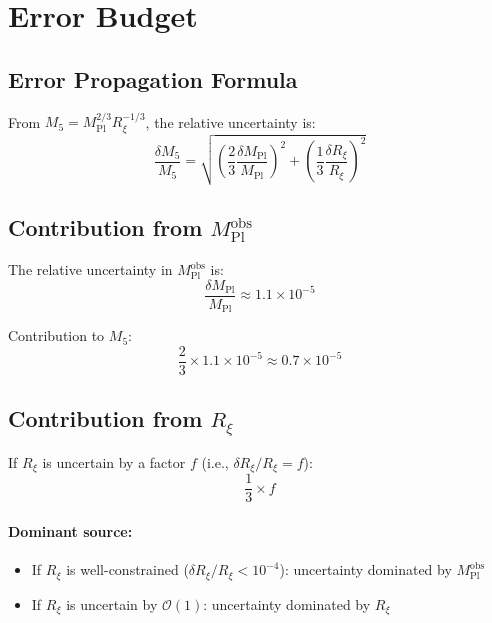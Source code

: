 \documentclass[11pt,a4paper]{article}
\newcommand{\Mpl}{M_{\text{Pl}}}
\newcommand{\Mfive}{M_5}
\newcommand{\Rxi}{R_\xi}
\newcommand{\obs}{\text{obs}}
\begin{document}
\section{Error Budget}
\label{sec:error}

\subsection{Error Propagation Formula}

From $\Mfive = \Mpl^{2/3} \Rxi^{-1/3}$, the relative uncertainty is:
\begin{equation}
\label{eq:error-prop}
\frac{\delta \Mfive}{\Mfive} = \sqrt{
\left( \frac{2}{3} \frac{\delta \Mpl}{\Mpl} \right)^2 +
\left( \frac{1}{3} \frac{\delta \Rxi}{\Rxi} \right)^2
}
\end{equation}

\subsection{Contribution from $\Mpl^{\obs}$}

The relative uncertainty in $\Mpl^{\obs}$ is:
\begin{equation}
\frac{\delta \Mpl}{\Mpl} \approx 1.1 \times 10^{-5}
\end{equation}

Contribution to $\Mfive$:
\begin{equation}
\frac{2}{3} \times 1.1 \times 10^{-5} \approx 0.7 \times 10^{-5}
\end{equation}

\subsection{Contribution from $\Rxi$}

If $\Rxi$ is uncertain by a factor $f$ (i.e., $\delta \Rxi / \Rxi = f$):
\begin{equation}
\frac{1}{3} \times f
\end{equation}

\paragraph{Dominant source:}
\begin{itemize}
    \item If $\Rxi$ is well-constrained ($\delta \Rxi / \Rxi < 10^{-4}$):
          uncertainty dominated by $\Mpl^{\obs}$
    \item If $\Rxi$ is uncertain by $\mathcal{O}(1)$:
          uncertainty dominated by $\Rxi$
\end{itemize}
\end{document}
